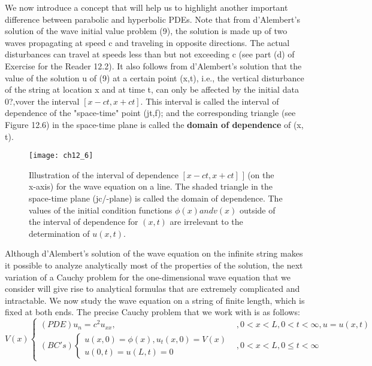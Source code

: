 \documentclass[../main.tex]{subfiles}
\begin{document}
We now introduce a concept that will help us to highlight another important
difference between parabolic and hyperbolic PDEs. Note that from d'Alembert's
solution of the wave initial value problem (9), the solution is made up of two
waves propagating at speed c and traveling in opposite directions. The actual
disturbances can travel at speeds less than but not exceeding c (see part (d) of
Exercise for the Reader 12.2). It also follows from d'Alembert's solution that the
value of the solution u of (9) at a certain point (x,t), i.e., the vertical disturbance of
the string at location x and at time t, can only be affected by the initial data
0?,vover the interval $[x-ct,x + ct]$. This interval is called the interval of 
\newpage
 dependence of the "space-time" point (jt,f); and the corresponding triangle (see
Figure 12.6) in the space-time plane is called the \textbf{domain of dependence} of (x, t).
\begin{figure}[H]
	\centering
	\texttt{[image: ch12\_6]}
	\caption{\textsf{  Illustration of the interval of dependence $[x-ct, x+ct]$ ] (on the x-axis)
for the wave equation on a line. The shaded triangle in the space-time plane (jc/-plane) is
called the domain of dependence. The values of the initial condition functions $\phi(x) and v(x)$ outside of the interval of dependence for $(x,t)$ are irrelevant to the
determination of $u(x,t)$. 
}}
	\label{pfig:ch12_6}
\end{figure}

Although d'Alembert's solution of the wave equation on the infinite string makes
it possible to analyze analytically most of the properties of the solution, the next
variation of a Cauchy problem for the one-dimensional wave equation that we
consider will give rise to analytical formulas that are extremely complicated and
intractable. We now study the wave equation on a string of finite length, which is
fixed at both ends. The precise Cauchy problem that we work with is as follows:
\begin{equation}
V(x)
	\begin{cases} 
(PDE) u_n=c^2 u_{xx}, &  ,0 < x < L, 0< t< \infty ,  u=u(x,t)\\
(BC's)
		\begin{cases}
		u(x,0)=\phi(x), u_t(x,0)=V(x)\\
		u(0,t)=u(L,t)=0
		\end{cases} 
		& ,0 < x < L, 0\leqslant t  < \infty
	\end{cases}
\end{equation}
\end{document}
